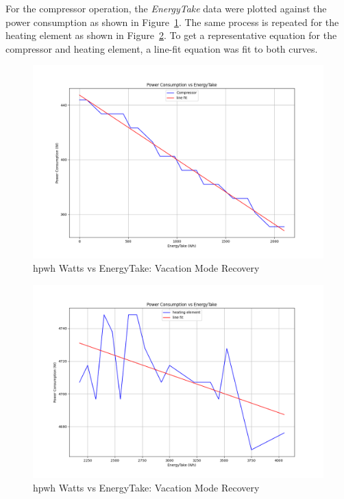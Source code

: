 For the compressor operation, the \textit{EnergyTake} data were plotted against the power consumption as shown in Figure~\ref{fig:w_wh_comp}. The same process is repeated for the heating element as shown in Figure~\ref{fig:w_wh_heating_elem}. To get a representative equation for the compressor and heating element, a line-fit equation was fit to both curves. 

\begin{figure}[htp!]
    \centering
    \includegraphics[width=0.99\columnwidth]{Pictures/watts_wh_relation_comp.png}
    \caption{\gls{hpwh} Watts vs EnergyTake: Vacation Mode Recovery}
    \label{fig:w_wh_comp}
\end{figure}

\begin{figure}[htp!]
    \centering
    \includegraphics[width=0.99\columnwidth]{Pictures/watts_wh_relation_heating_element.png}
    \caption{\gls{hpwh} Watts vs EnergyTake: Vacation Mode Recovery}
    \label{fig:w_wh_heating_elem}
\end{figure}

